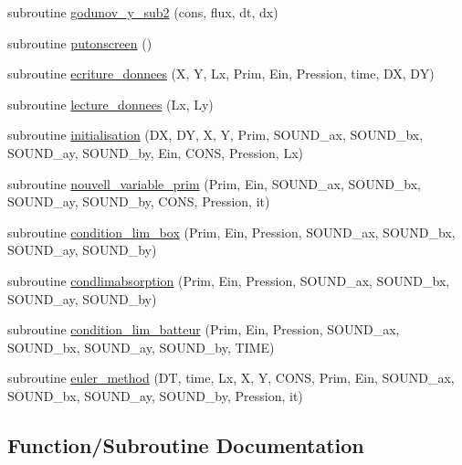 \begin{DoxyCompactItemize}
\item 
subroutine \mbox{\hyperlink{main2Dv1_8f90_af2bc178b3e046a285b7e624ecb7246b8}{godunov\+\_\+y\+\_\+sub2}} (cons, flux, dt, dx)
\item 
subroutine \mbox{\hyperlink{main2Dv1_8f90_a8a5b072c001df1496416cc96562c9916}{putonscreen}} ()
\item 
subroutine \mbox{\hyperlink{main2Dv1_8f90_aff02bfa8466e376e08fed7a99aae4039}{ecriture\+\_\+donnees}} (X, Y, Lx, Prim, Ein, Pression, time, DX, DY)
\item 
subroutine \mbox{\hyperlink{main2Dv1_8f90_a7e06ba833aef7743b6a2f1be79f4bc2e}{lecture\+\_\+donnees}} (Lx, Ly)
\item 
subroutine \mbox{\hyperlink{main2Dv1_8f90_afb1c4be5a540eb38b6217aa886b964a5}{initialisation}} (DX, DY, X, Y, Prim, S\+O\+U\+N\+D\+\_\+ax, S\+O\+U\+N\+D\+\_\+bx, S\+O\+U\+N\+D\+\_\+ay, S\+O\+U\+N\+D\+\_\+by, Ein, C\+O\+NS, Pression, Lx)
\item 
subroutine \mbox{\hyperlink{main2Dv1_8f90_a7e8756401e9774b000709214edc41a76}{nouvell\+\_\+variable\+\_\+prim}} (Prim, Ein, S\+O\+U\+N\+D\+\_\+ax, S\+O\+U\+N\+D\+\_\+bx, S\+O\+U\+N\+D\+\_\+ay, S\+O\+U\+N\+D\+\_\+by, C\+O\+NS, Pression, it)
\item 
subroutine \mbox{\hyperlink{main2Dv1_8f90_a2e4131a2a733710c33c03656b6a7fb34}{condition\+\_\+lim\+\_\+box}} (Prim, Ein, Pression, S\+O\+U\+N\+D\+\_\+ax, S\+O\+U\+N\+D\+\_\+bx, S\+O\+U\+N\+D\+\_\+ay, S\+O\+U\+N\+D\+\_\+by)
\item 
subroutine \mbox{\hyperlink{main2Dv1_8f90_a4fa8d6d2b6084471f67e67e44694e3a7}{condlimabsorption}} (Prim, Ein, Pression, S\+O\+U\+N\+D\+\_\+ax, S\+O\+U\+N\+D\+\_\+bx, S\+O\+U\+N\+D\+\_\+ay, S\+O\+U\+N\+D\+\_\+by)
\item 
subroutine \mbox{\hyperlink{main2Dv1_8f90_ae64974281df2d6f2222187665fd79e38}{condition\+\_\+lim\+\_\+batteur}} (Prim, Ein, Pression, S\+O\+U\+N\+D\+\_\+ax, S\+O\+U\+N\+D\+\_\+bx, S\+O\+U\+N\+D\+\_\+ay, S\+O\+U\+N\+D\+\_\+by, T\+I\+ME)
\item 
subroutine \mbox{\hyperlink{main2Dv1_8f90_a1874243fd0ebdb9c1e1cd78468b4cfac}{euler\+\_\+method}} (DT, time, Lx, X, Y, C\+O\+NS, Prim, Ein, S\+O\+U\+N\+D\+\_\+ax, S\+O\+U\+N\+D\+\_\+bx, S\+O\+U\+N\+D\+\_\+ay, S\+O\+U\+N\+D\+\_\+by, Pression, it)
\end{DoxyCompactItemize}


\subsection{Function/\+Subroutine Documentation}
\mbox{\label{main2Dv1_8f90_a8712173bc20143ca5b1b8cbd782b563e}} 
